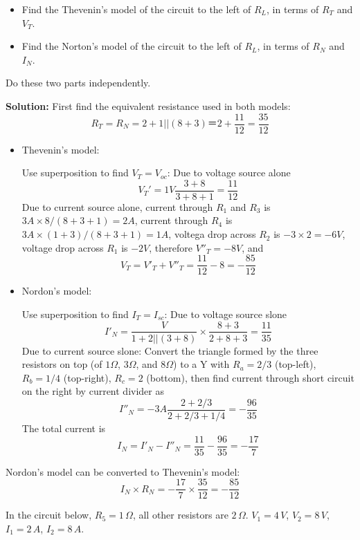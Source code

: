 \begin{enumerate}
  \begin{itemize}
  \item Find the Thevenin's model of the circuit to the left of 
    $R_L$, in terms of $R_T$ and $V_T$.
  \item Find the Norton's model of the circuit to the left of 
    $R_L$, in terms of $R_N$ and $I_N$.
  \end{itemize}

  Do these two parts independently.

  {\bf Solution:} 
  First find the equivalent resistance used in both models:
  \[
  R_T=R_N=2+1||(8+3)＝2+\frac{11}{12}=\frac{35}{12}
  \]
  \begin{itemize}
  \item Thevenin's model: 

    Use superposition to find $V_T=V_{oc}$:
    Due to voltage source alone
    \[
    V_T'=1V\frac{3+8}{3+8+1}=\frac{11}{12}
    \]
    Due to current source alone, current through $R_1$ and $R_3$ is
    $3A\times 8/(8+3+1) =2A$, current through $R_4$ is
    $3A\times (1+3)/(8+3+1) =1A$, voltega drop across $R_2$ is
    $-3\times 2=-6V$, voltage drop across $R_1$ is $-2V$, therefore
    $V''_T=-8V$, and
    \[
    V_T=V'_T+V''_T=\frac{11}{12}-8=-\frac{85}{12}
    \]
  \item Nordon's model:

    Use superposition to find $I_T=I_{sc}$:
    Due to voltage source slone
    \[
    I'_N=\frac{V}{1+2||(3+8)}\times\frac{8+3}{2+8+3}=\frac{11}{35}
    \]
    Due to current source slone:
    Convert the triangle formed by the three resistors on top
    (of $1\Omega$, $3\Omega$, and $8 \Omega$) to a Y with
    $R_a=2/3$ (top-left), $R_b=1/4$ (top-right), $R_c=2$ (bottom),
    then find current through short circuit on the right by current
    divider as
    \[
    I''_N=-3A\frac{2+2/3}{2+2/3+1/4}=-\frac{96}{35}
    \]
    The total current is
    \[
    I_N=I'_N-I''_N=\frac{11}{35}-\frac{96}{35}=-\frac{17}{7}
    \]
  \end{itemize}

  Nordon's model can be converted to Thevenin's model:
  \[
  I_N\times R_N=-\frac{17}{7}\times\frac{35}{12}=-\frac{85}{12}
  \]

\end{enumerate}



  In the circuit below, $R_5=1\,\Omega$, all other resistors are
  $2\,\Omega$. $V_1=4\,V$, $V_2=8\,V$, $I_1=2\,A$, $I_2=8\,A$.

